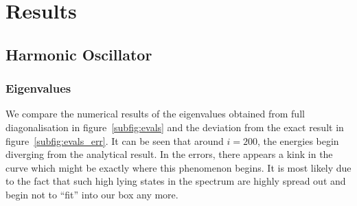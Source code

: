 \documentclass[a4paper,DIV=12,english]{scrartcl}
\begin{document}
\FloatBarrier
\section{Results}
\subsection{Harmonic Oscillator}
\subsubsection{Eigenvalues}
We compare the numerical results of the eigenvalues obtained from full diagonalisation in figure~\ref{subfig:evals} and the deviation from the exact result in figure~\ref{subfig:evals_err}. It can be seen that around $i=200$, the energies begin diverging from the analytical result. In the errors, there appears a kink in the curve which might be exactly where this phenomenon begins. It is most likely due to the fact that such high lying states in the spectrum are highly spread out and begin not to \enquote{fit} into our box any more.
\end{document}
